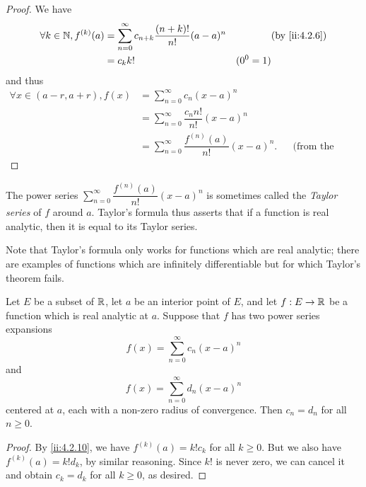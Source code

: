 \begin{proof}
  We have
  \begin{align*}
    \forall k \in \N, f^{(k)}(a) & = \sum_{n = 0}^\infty c_{n + k} \dfrac{(n + k)!}{n!} (a - a)^n &           & \by{ii:4.2.6} \\
                                 & = c_k k!                                                       & (0^0 = 1)
  \end{align*}
  and thus
  \begin{align*}
    \forall x \in (a - r, a + r), f(x) & = \sum_{n = 0}^\infty c_n (x - a)^n                                                        \\
                                       & = \sum_{n = 0}^\infty \dfrac{c_n n!}{n!} (x - a)^n                                         \\
                                       & = \sum_{n = 0}^\infty \dfrac{f^{(n)}(a)}{n!} (x - a)^n. &  & \text{(from the proof above)}
  \end{align*}
\end{proof}

\begin{note}
  The power series \(\sum_{n = 0}^\infty \dfrac{f^{(n)}(a)}{n!} (x - a)^n\) is sometimes called the \emph{Taylor series} of \(f\) around \(a\).
  Taylor's formula thus asserts that if a function is real analytic, then it is equal to its Taylor series.
\end{note}

\begin{rmk}\label{ii:4.2.11}
  Note that Taylor's formula only works for functions which are real analytic;
  there are examples of functions which are infinitely differentiable but for which Taylor's theorem fails.
\end{rmk}

\begin{cor}\label{ii:4.2.12}
  Let \(E\) be a subset of \(\mathbb{R}\), let \(a\) be an interior point of \(E\), and let \(f : E \to \mathbb{R}\) be a function which is real analytic at \(a\).
  Suppose that \(f\) has two power series expansions
  \[
    f(x) = \sum_{n = 0}^\infty c_n (x - a)^n
  \]
  and
  \[
    f(x) = \sum_{n = 0}^\infty d_n (x - a)^n
  \]
  centered at \(a\), each with a non-zero radius of convergence.
  Then \(c_n = d_n\) for all \(n \geq 0\).
\end{cor}

\begin{proof}
  By \cref{ii:4.2.10}, we have \(f^{(k)}(a) = k! c_k\) for all \(k \geq 0\).
  But we also have \(f^{(k)}(a) = k! d_k\), by similar reasoning.
  Since \(k!\) is never zero, we can cancel it and obtain \(c_k = d_k\) for all \(k \geq 0\), as desired.
\end{proof}

